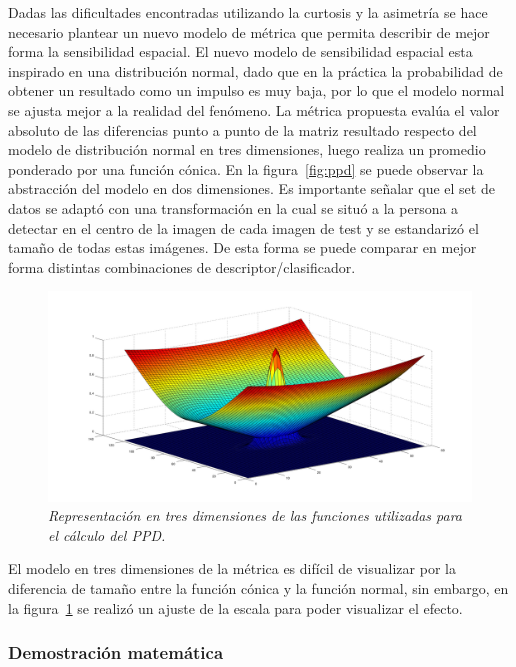 Dadas las dificultades encontradas utilizando la curtosis y la asimetría se hace necesario plantear un nuevo modelo de métrica que  permita describir de mejor forma la sensibilidad espacial. El nuevo modelo de sensibilidad espacial esta inspirado en una distribución normal, dado que en la práctica la probabilidad de obtener un resultado como un impulso es muy baja, por lo que el modelo normal se ajusta mejor a la realidad del fenómeno. La métrica propuesta evalúa el valor absoluto de las diferencias punto a punto de la matriz resultado respecto del modelo de distribución normal en tres dimensiones, luego realiza un promedio ponderado por una función cónica. En la figura~\ref{fig:ppd} se puede observar la abstracción del modelo en dos dimensiones. Es importante señalar que el set de datos se adaptó con una transformación en la cual se situó a la persona a detectar en el centro de la imagen de cada imagen de test y se estandarizó el tamaño de todas estas imágenes. De esta forma se puede comparar en mejor forma distintas combinaciones de descriptor/clasificador.

\begin{figure}[H]
  \centering
  \includegraphics[scale=.3]{images/metrica}
  \caption{\em Representación en tres dimensiones de las funciones utilizadas para el cálculo del PPD.}  
  \label{fig:ppd3d}
\end{figure}

El modelo en tres dimensiones de la métrica es difícil de visualizar por la diferencia de tamaño entre la función cónica y la función normal, sin embargo, en la figura~\ref{fig:ppd3d} se realizó un ajuste de la escala para poder visualizar el efecto.

\subsubsection{Demostración matemática}
\label{sec:dem}

